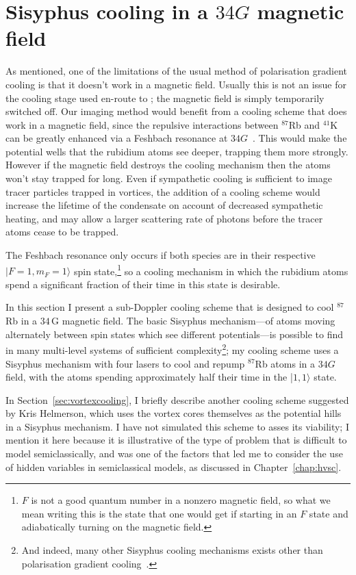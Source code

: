 \section{Sisyphus cooling in a $34\unit{G}$ magnetic field}\label{sec:laser_cooling_simulations}

As mentioned, one of the limitations of the usual method of polarisation gradient cooling is that it doesn't work in a magnetic field. Usually this is not an issue for the cooling stage used en-route to \bec; the magnetic field is simply temporarily switched off. Our imaging method would benefit from a cooling scheme that does work in a magnetic field, since the repulsive interactions between $^{87}$Rb and $^{41}$K can be greatly enhanced via a Feshbach resonance at $34 \unit{G}$~\cite{thalhammer_double_2008}. This would make the potential wells that the rubidium atoms see deeper, trapping them more strongly. However if the magnetic field destroys the cooling mechanism then the atoms won't stay trapped for long. Even if sympathetic cooling is sufficient to image tracer particles trapped in vortices, the addition of a cooling scheme would increase the lifetime of the condensate on account of decreased sympathetic heating, and may allow a larger scattering rate of photons before the tracer atoms cease to be trapped.

The Feshbach resonance only occurs if both species are in their respective \mbox{$|F=1,m_F=1\rangle$} spin state,\footnote{$F$ is not a good quantum number in a nonzero magnetic field, so what we mean writing this is the state that one would get if starting in an $F$ state and adiabatically turning on the magnetic field.} so a cooling mechanism in which the rubidium atoms spend a significant fraction of their time in this state is desirable.

In this section I present a sub-Doppler cooling scheme that is designed to cool $^{87}$Rb in a $34\,$G magnetic field. The basic Sisyphus mechanism---of atoms moving alternately between spin states which see different potentials---is possible to find in many multi-level systems of sufficient complexity\footnote{And indeed, many other Sisyphus cooling mechanisms exists other than polarisation gradient cooling~\cite[p 116]{metcalf_laser_1999}.}; my cooling scheme uses a Sisyphus mechanism with four lasers to cool and repump $^{87}$Rb atoms in a $34\unit{G}$ field, with the atoms spending approximately half their time in the \mbox{|$1,1\rangle$} state.

In Section~\ref{sec:vortexcooling}, I briefly describe another cooling scheme suggested by Kris Helmerson, which uses the vortex cores themselves as the potential hills in a Sisyphus mechanism. I have not simulated this scheme to asses its viability; I mention it here because it is illustrative of the type of problem that is difficult to model semiclassically, and was one of the factors that led me to consider the use of hidden variables in semiclassical models, as discussed in Chapter~\ref{chap:hvsc}.


